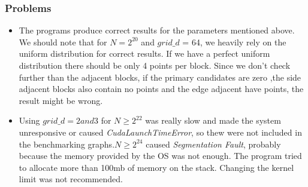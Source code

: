 \documentclass[10pt,a4paper]{article}
\begin{document}
\subsubsection*{Problems}
\begin{itemize}
\item The programs produce correct results for the parameters mentioned above. We should note that for $N = 2^{20}$ and $grid\_d$ = 64, we heavily rely on the uniform distribution for correct results. If we have a perfect uniform distribution there should be only 4 points per block. Since we don't check further than the adjacent blocks, if the primary candidates are zero ,the side adjacent blocks also contain no points and the edge adjacent have points, the result might be wrong.
\item Using $grid\_d = 2 and 3$ for $N \geq 2^{22}$ was really slow and made the system unresponsive or caused \textit{CudaLaunchTimeError}, so thew were not included in the benchmarking graphs.$N \geq 2^{24}$ caused \textit{Segmentation Fault}, probably because the memory provided by the OS was not enough. The program tried to allocate more than 100mb of memory on the stack. Changing the kernel limit was not recommended.
\end{itemize}
\end{document}
